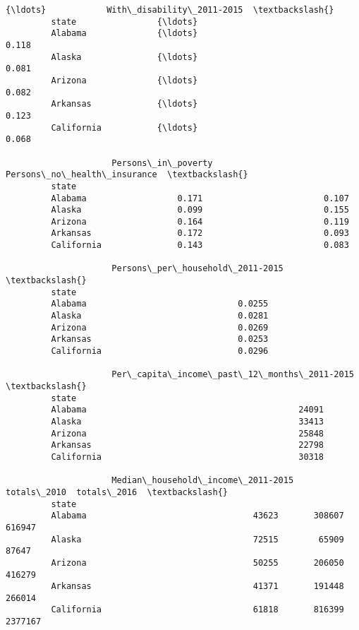 \documentclass[11pt]{article}
\begin{document}
\begin{Verbatim}[commandchars=\\\{\}]
                              {\ldots}            With\_disability\_2011-2015  \textbackslash{}
         state                {\ldots}                                        
         Alabama              {\ldots}                                0.118   
         Alaska               {\ldots}                                0.081   
         Arizona              {\ldots}                                0.082   
         Arkansas             {\ldots}                                0.123   
         California           {\ldots}                                0.068   
         
                     Persons\_in\_poverty  Persons\_no\_health\_insurance  \textbackslash{}
         state                                                         
         Alabama                  0.171                        0.107   
         Alaska                   0.099                        0.155   
         Arizona                  0.164                        0.119   
         Arkansas                 0.172                        0.093   
         California               0.143                        0.083   
         
                     Persons\_per\_household\_2011-2015  \textbackslash{}
         state                                         
         Alabama                              0.0255   
         Alaska                               0.0281   
         Arizona                              0.0269   
         Arkansas                             0.0253   
         California                           0.0296   
         
                     Per\_capita\_income\_past\_12\_months\_2011-2015  \textbackslash{}
         state                                                    
         Alabama                                          24091   
         Alaska                                           33413   
         Arizona                                          25848   
         Arkansas                                         22798   
         California                                       30318   
         
                     Median\_household\_income\_2011-2015  totals\_2010  totals\_2016  \textbackslash{}
         state                                                                     
         Alabama                                 43623       308607       616947   
         Alaska                                  72515        65909        87647   
         Arizona                                 50255       206050       416279   
         Arkansas                                41371       191448       266014   
         California                              61818       816399      2377167   
         

\end{Verbatim}
\end{document}

